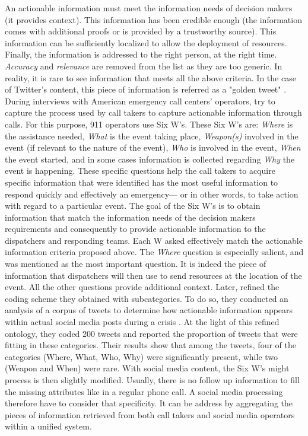An actionable information must meet the information needs of decision makers (it provides context).
This information has been credible enough (the information comes with additional proofs or is provided by a trustworthy source).
This information can be sufficiently localized to allow the deployment of resources.
Finally, the information is addressed to the right person, at the right time.
\textit{Accuracy} and \textit{relevance} are removed from the list as they are too generic.
In reality, it is rare to see information that meets all the above criteria.
In the case of Twitter's content, this piece of information is referred as a "golden tweet" \parencite{kropczynskiIdentifyingActionableInformation2018}.
During interviews with American emergency call centers' operators, \textcite{kropczynskiIdentifyingActionableInformation2018}
try to capture the process used by call takers to capture actionable information through calls.
For this purpose, 911 operators use Six W's.
These Six W's are: \textit{Where} is the assistance needed, \textit{What} is the event taking place,
\textit{Weapon(s)} involved in the event (if relevant to the nature of the event),
\textit{Who} is involved in the event, \textit{When} the event started,
and in some cases information is collected regarding \textit{Why} the event is happening.
These specific questions help the call takers to acquire specific information that were
identified has the most useful information to respond quickly and effectively an emergency—
or in other words, to take action with regard to a particular event.
The goal of the Six W's is to obtain information that match the information needs of the decision makers requirements and consequently to provide actionable information to the dispatchers and responding teams.
Each W asked effectively match the actionable information criteria proposed above.
The \textit{Where} question is especially salient, and was mentioned as the most important question.
It is indeed the piece of information that dispatchers will then use to send resources at the location of the event.
All the other questions provide additional context.
Later, \citeauthor{kropczynskiIdentifyingActionableInformation2018} refined the coding scheme they obtained with subcategories.
To do so, they conducted an analysis of a corpus of tweets to determine how actionable information appears within actual social media posts during a crisis \parencite{kropczynskiRefiningCodingScheme2019}.
At the light of this refined ontology, they coded 200 tweets and reported the proportion of tweets that were fitting in these categories.
Their results show that among the tweets, four of the categories (Where, What, Who, Why) were significantly present, while two (Weapon and When) were rare.
With social media content, the Six W's might process is then slightly modified.
Usually, there is no follow up information to fill the missing attributes like in a regular phone call.
A social media processing therefore have to consider that specificity.
It can be address by aggregating the pieces of information retrieved from both call takers and social media operators within a unified system.

